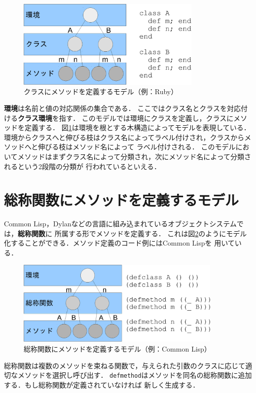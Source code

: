\documentclass[a4paper,11pt,dvipdfmx]{jreport}
\begin{document}
\begin{figure}[htbp]
	\centering
	\includegraphics[width=9cm]{fig/trees_class-crop.pdf}
	\caption{クラスにメソッドを定義するモデル（例：Ruby）}
	\label{figure:class-model}
\end{figure}

\textbf{環境}は名前と値の対応関係の集合である．
ここではクラス名とクラスを対応付ける\textbf{クラス環境}を指す．
このモデルでは環境にクラスを定義し，クラスにメソッドを定義する．
図\ref{figure:class-model}は環境を根とする木構造によってモデルを表現している．
環境からクラスへと伸びる枝はクラス名によってラベル付けされ，クラスからメソッドへと伸びる枝はメソッド名によって
ラベル付けされる．
このモデルにおいてメソッドはまずクラス名によって分類され，次にメソッド名によって分類されるという2段階の分類が
行われているといえる．

\section{総称関数にメソッドを定義するモデル}

Common Lisp，Dylanなどの言語に組み込まれているオブジェクトシステムでは，\textbf{総称関数}に
所属する形でメソッドを定義する．
これは図\ref{figure:gf-model}のようにモデル化することができる．メソッド定義のコード例にはCommon Lispを
用いている．

\begin{figure}[htbp]
	\centering
	\includegraphics[width=10cm]{fig/trees_gf-crop.pdf}
	\caption{総称関数にメソッドを定義するモデル（例：Common Lisp）}
	\label{figure:gf-model}
\end{figure}

総称関数は複数のメソッドを束ねる関数で，与えられた引数のクラスに応じて適切なメソッドを選択し呼び出す．
\verb|defmethod|はメソッドを同名の総称関数に追加する．もし総称関数が定義されていなければ
新しく生成する．
\end{document}
